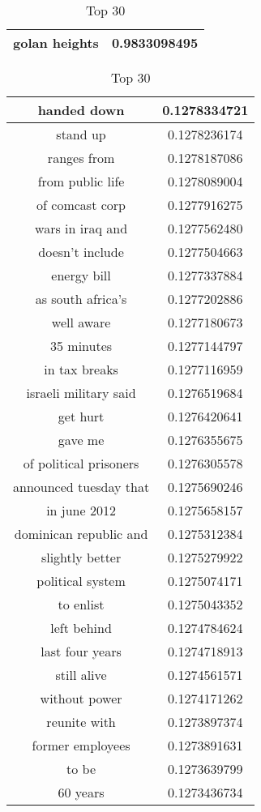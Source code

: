 \documentclass{article}
\begin{document}
\begin{table}[ht]
{\begin{tabular}{|c|c|}
\hline
golan heights & 0.9833098495\\
\hline
\end{tabular}
\caption{Top 30}
}
\hfill
\parbox{.22\linewidth}{
\centering
\begin{tabular}{|c|c|}
\hline
handed down & 0.1278334721\\
\hline
stand up & 0.1278236174\\
\hline
ranges from & 0.1278187086\\
\hline
from public life & 0.1278089004\\
\hline
of comcast corp & 0.1277916275\\
\hline
wars in iraq and & 0.1277562480\\
\hline
doesn't include & 0.1277504663\\
\hline
energy bill & 0.1277337884\\
\hline
as south africa's & 0.1277202886\\
\hline
well aware & 0.1277180673\\
\hline
35 minutes & 0.1277144797\\
\hline
in tax breaks & 0.1277116959\\
\hline
israeli military said & 0.1276519684\\
\hline
get hurt & 0.1276420641\\
\hline
gave me & 0.1276355675\\
\hline
of political prisoners & 0.1276305578\\
\hline
announced tuesday that & 0.1275690246\\
\hline
in june 2012 & 0.1275658157\\
\hline
dominican republic and & 0.1275312384\\
\hline
slightly better & 0.1275279922\\
\hline
political system & 0.1275074171\\
\hline
to enlist & 0.1275043352\\
\hline
left behind & 0.1274784624\\
\hline
last four years & 0.1274718913\\
\hline
still alive & 0.1274561571\\
\hline
without power & 0.1274171262\\
\hline
reunite with & 0.1273897374\\
\hline
former employees & 0.1273891631\\
\hline
to be & 0.1273639799\\
\hline
60 years & 0.1273436734\\

\end{tabular}}
\end{table}
\end{document}
